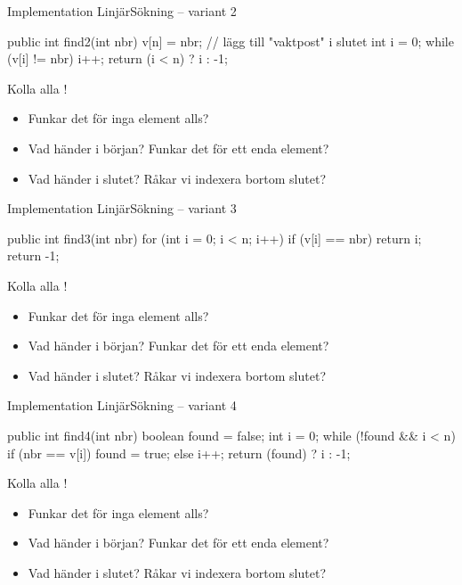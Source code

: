 \documentclass{lecturenotes}
\begin{document}
\begin{Slide}{Implementation LinjärSökning -- variant 2}
\begin{Code}
public int find2(int nbr) {
    v[n] = nbr;  // lägg till "vaktpost" i slutet
    int i = 0;
    while (v[i] != nbr) {
        i++;
    }
    return (i < n) ? i : -1;
}
\end{Code}
\footnotesize Kolla alla !
\begin{itemize}
\item Funkar det för inga element alls?
\item Vad händer i början? Funkar det för ett enda element?
\item Vad händer i slutet? Råkar vi indexera bortom slutet?
\end{itemize}
\end{Slide} 

\begin{Slide}{Implementation LinjärSökning -- variant 3}
\begin{Code}
public int find3(int nbr) {
    for (int i = 0; i < n; i++) {
        if (v[i] == nbr) {
            return i;
        }
    }
    return -1;
}
\end{Code}
\footnotesize Kolla alla !
\begin{itemize}
\item Funkar det för inga element alls?
\item Vad händer i början? Funkar det för ett enda element?
\item Vad händer i slutet? Råkar vi indexera bortom slutet?
\end{itemize}
\end{Slide} 

\begin{Slide}{Implementation LinjärSökning -- variant 4}
\begin{Code}
public int find4(int nbr) {
    boolean found = false;
    int i = 0;
    while (!found && i < n) {
        if (nbr == v[i]) {
            found = true;
        }
        else {
            i++; 
        }
    }
    return (found) ? i : -1;
}
\end{Code}
\footnotesize Kolla alla !
\begin{itemize}
\item Funkar det för inga element alls?
\item Vad händer i början? Funkar det för ett enda element?
\item Vad händer i slutet? Råkar vi indexera bortom slutet?
\end{itemize}
\end{Slide} 
\end{document}
